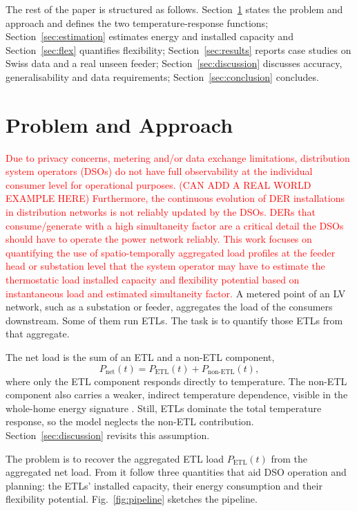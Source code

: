\documentclass[9pt,journal,a4]{IEEEtran}
\begin{document}
The rest of the paper is structured as follows. Section~\ref{sec:problem} states the problem and approach and defines the two temperature-response functions; Section~\ref{sec:estimation} estimates energy and installed capacity and Section~\ref{sec:flex} quantifies flexibility; Section~\ref{sec:results} reports case studies on Swiss data and a real unseen feeder; Section~\ref{sec:discussion} discusses accuracy, generalisability and data requirements; Section~\ref{sec:conclusion} concludes.

\section{Problem and Approach}
\label{sec:problem}
\label{sec:fits}
\textcolor{red}{
Due to privacy concerns, metering and/or data exchange limitations, distribution system operators (DSOs) do not have full observability at the individual consumer level for operational purposes. (CAN ADD A REAL WORLD EXAMPLE HERE)
Furthermore, the continuous evolution of DER installations in distribution networks is not reliably updated by the DSOs. DERs that consume/generate with a high simultaneity factor are a critical detail the DSOs should have to operate the power network reliably.
This work focuses on quantifying the use of spatio-temporally aggregated load profiles at the feeder head or substation level that the system operator may have to estimate the thermostatic load installed capacity and flexibility potential based on instantaneous load and estimated simultaneity factor.
}
A metered point of an LV network, such as a substation or feeder, aggregates the load of the consumers downstream. Some of them run ETLs. The task is to quantify those ETLs from that aggregate.

The net load is the sum of an ETL and a non-ETL component,
\begin{equation}
P_{\mathrm{net}}(t) = P_{\mathrm{ETL}}(t) + P_{\text{non-ETL}}(t),
\label{eq:decomp}
\end{equation}
where only the ETL component responds directly to temperature. The non-ETL component also carries a weaker, indirect temperature dependence, visible in the whole-home energy signature \cite{Wes20}. Still, ETLs dominate the total temperature response, so the model neglects the non-ETL contribution. Section~\ref{sec:discussion} revisits this assumption.

The problem is to recover the aggregated ETL load $P_{\mathrm{ETL}}(t)$ from the aggregated net load. From it follow three quantities that aid DSO operation and planning: the ETLs' installed capacity, their energy consumption and their flexibility potential. Fig.~\ref{fig:pipeline} sketches the pipeline.
\end{document}
